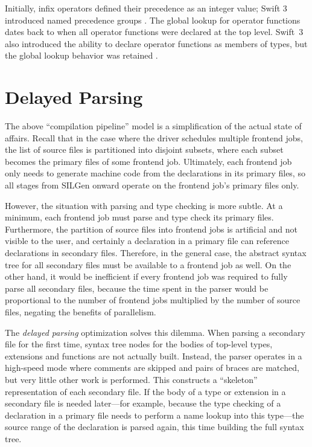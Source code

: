 \documentclass[a4paper,headsepline,bibliography=totoc,toc=flat,fleqn,twoside=semi]{scrbook}
\theoremstyle{definition}
\theoremstyle{definition}
\theoremstyle{definition}
\begin{document}
Initially, infix operators defined their precedence as an integer value; Swift 3 introduced named precedence groups \cite{se0077}. The global lookup for operator functions dates back to when all operator functions were declared at the top level. Swift~3 also introduced the ability to declare operator functions as members of types, but the global lookup behavior was retained \cite{se0091}.

\section{Delayed Parsing}

The above ``compilation pipeline'' model is a simplification of the actual state of affairs. Recall that in the case where the driver schedules multiple frontend jobs, the list of source files is partitioned into disjoint subsets, where each subset becomes the primary files of some frontend job. Ultimately, each frontend job only needs to generate machine code from the declarations in its primary files, so all stages from SILGen onward operate on the frontend job's primary files only.

However, the situation with parsing and type checking is more subtle. At a minimum, each frontend job must parse and type check its primary files. Furthermore, the partition of source files into frontend jobs is artificial and not visible to the user, and certainly a declaration in a primary file can reference declarations in secondary files. Therefore, in the general case, the abstract syntax tree for all secondary files must be available to a frontend job as well. On the other hand, it would be inefficient if every frontend job was required to fully parse all secondary files, because the time spent in the parser would be proportional to the number of frontend jobs multiplied by the number of source files, negating the benefits of parallelism.

The \emph{delayed parsing} optimization solves this dilemma. When parsing a secondary file for the first time, syntax tree nodes for the bodies of top-level types, extensions and functions are not actually built. Instead, the parser operates in a high-speed mode where comments are skipped and pairs of braces are matched, but very little other work is performed. This constructs a ``skeleton'' representation of each secondary file. If the body of a type or extension in a secondary file is needed later---for example, because the type checking of a declaration in a primary file needs to perform a name lookup into this type---the source range of the declaration is parsed again, this time building the full syntax tree.
\end{document}
